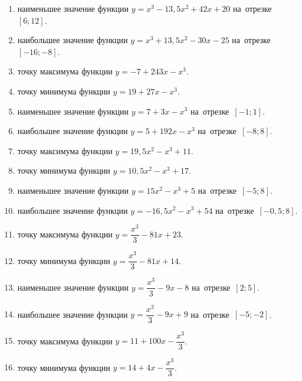 \documentclass[a4paper,10pt]{article}
\begin{document}
\begin{enumerate}
\item {} наименьшее значение функции $y=x^3 -13,5x^2+42x+20$ на~отрезке~$\left[6;12\right]$.

\item {} наибольшее значение функции $y=x^3 +13,5x^2-30x-25$ на~отрезке~$\left[-16;-8\right]$.

\item {} точку максимума функции $y=-7+243x-x^3$.

\item {} точку минимума функции $y=19+27x-x^3$.

\item {} наименьшее значение функции $y=7+3x-x^3$ на~отрезке~$\left[-1;1\right]$.

\item {} наибольшее значение функции $y=5+192x-x^3$ на~отрезке~$\left[-8;8\right]$.

\item {} точку максимума функции $y=19,5x^2-x^3+11$.

\item {} точку минимума функции $y=10,5x^2-x^3+17$.

\item {} наименьшее значение функции $y=15x^2-x^3+5$ на~отрезке~$\left[-5;8\right]$.

\item {} наибольшее значение функции $y=-16,5x^2-x^3+54$ на~отрезке~$\left[-0,5;8\right]$.

\item {} точку максимума функции $y=\dfrac{x^3}{3} -81x+23$.

\item {} точку минимума функции $y=\dfrac{x^3}{3} -81x+14$.

\item {} наименьшее значение функции $y=\dfrac{x^3}{3} -9x-8$ на~отрезке~$\left[2;5\right]$.

\item {} наибольшее значение функции $y=\dfrac{x^3}{3} -9x+9$ на~отрезке~$\left[-5;-2\right]$.

\item {} точку максимума функции $y=11 +100x-\dfrac{x^3}{3}$.

\item {} точку минимума функции $y=14 +4x-\dfrac{x^3}{3}$.


\end{enumerate}
\end{document}
